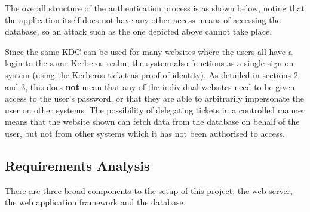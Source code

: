 \documentclass{article}
\begin{document}
The overall structure of the authentication process is as shown below, noting that the application itself does not have any other access means of accessing the database, so an attack such as the one depicted above cannot take place.

Since the same KDC can be used for many websites where the users all have a login to the same Kerberos realm, the system also functions as a single sign-on system (using the Kerberos ticket as proof of identity). As detailed in sections 2 and 3, this does \textbf{not} mean that any of the individual websites need to be given access to the user's password, or that they are able to arbitrarily impersonate the user on other systems. The possibility of delegating tickets in a controlled manner means that the website shown can fetch data from the database on behalf of the user, but not from other systems which it has not been authorised to access.


\subsection{Requirements Analysis}
There are three broad components to the setup of this project: the web server, the web application framework and the database.
\end{document}

